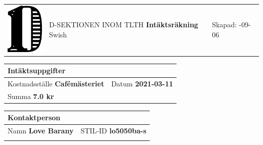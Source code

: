 \documentclass{article}
\newcommand{\skapad}{2021-09-06}
\newcommand{\kostnadsstalle}{Cafémästeriet}
\newcommand{\typ}{Swish}
\newcommand{\datum}{2021-03-11}
\newcommand{\summa}{7.0 kr}
\newcommand{\namn}{Love Barany}
\newcommand{\stilid}{lo5050ba-s}
\begin{document}
    \hspace{-0.3in}
    \begin{tabular}{p{1.0in}p{3.5in}p{2in}}
    \includegraphics[width=0.8in]{D-symbol.pdf} &
    \vspace{-1in}
    {\large \uppercase{D-sektionen inom TLTH}} \newline \newline
    {\Huge \textsf{\textbf{Intäktsräkning}}}
    \newline \newline
    {\large \typ}&
    \vspace{-1in}
    Skapad: \newline
    \skapad \newline
    \end{tabular}

    \vspace{0.5in}
    \hspace{-0.3in}
    \begin{tabular}{|p{1.4in}|p{0.9in}|}
        \multicolumn{2}{l}{Intäktsuppgifter} \\
        \hline
        {\footnotesize Kostnadsställe} \newline \textbf{\kostnadsstalle}&
        {\footnotesize Datum} \newline \textbf{\datum} \\
        \hline
        \multicolumn{2}{|p{2.3in}|}{{\footnotesize Summa} \newline \textbf{\summa}} \\
        \hline
    \end{tabular}
    \hspace{0.1in}
    \begin{tabular}{|p{1.3in}|p{0.9in}|p{1.1in}|}
        \multicolumn{3}{l}{Kontaktperson} \\
        \hline
        \multicolumn{2}{|p{2.2in}|}{{\footnotesize Namn} \newline \textbf{\namn}}
          &
         {\footnotesize STIL-ID} \newline \textbf{\stilid} \\
         \hline
         \multicolumn{3}{p{3.3in}}{{\footnotesize \quad} \newline \textbf{\quad}}
    \end{tabular}
\end{document}
